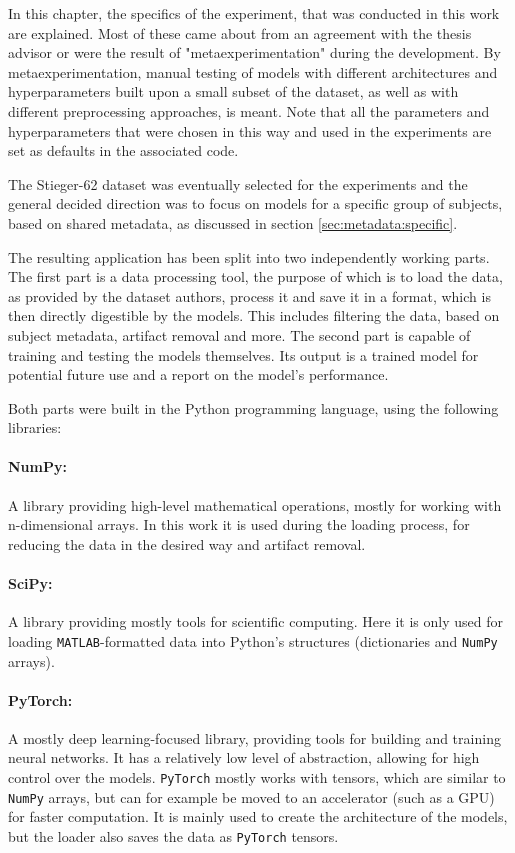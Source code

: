 \documentclass[english, he, bc, kiv, iso690alph]{fasthesis}
\begin{document}
In this chapter, the specifics of the experiment, that was conducted in this work are explained. Most of these came about from an agreement with the thesis advisor or were the result of "metaexperimentation" during the development. By metaexperimentation, manual testing of models with different architectures and hyperparameters built upon a small subset of the dataset, as well as with different preprocessing approaches, is meant. Note that all the parameters and hyperparameters that were chosen in this way and used in the experiments are set as defaults in the associated code.

The Stieger-62 dataset was eventually selected for the experiments and the general decided direction was to focus on models for a specific group of subjects, based on shared metadata, as discussed in section \ref{sec:metadata:specific}.

The resulting application has been split into two independently working parts. The first part is a data processing tool, the purpose of which is to load the data, as provided by the dataset authors, process it and save it in a format, which is then directly digestible by the models. This includes filtering the data, based on subject metadata, artifact removal and more. The second part is capable of training and testing the models themselves. Its output is a trained model for potential future use and a report on the model's performance.

Both parts were built in the Python programming language, using the following libraries:

\paragraph{NumPy:} A library providing high-level mathematical operations, mostly for working with n-dimensional arrays. In this work it is used during the loading process, for reducing the data in the desired way and artifact removal.

\paragraph{SciPy:} A library providing mostly tools for scientific computing. Here it is only used for loading \texttt{MATLAB}-formatted data into Python's structures (dictionaries and \texttt{NumPy} arrays).

\paragraph{PyTorch:} A mostly deep learning-focused library, providing tools for building and training neural networks. It has a relatively low level of abstraction, allowing for high control over the models. \texttt{PyTorch} mostly works with tensors, which are similar to \texttt{NumPy} arrays, but can for example be moved to an accelerator (such as a GPU) for faster computation. It is mainly used to create the architecture of the models, but the loader also saves the data as \texttt{PyTorch} tensors.
\end{document}
